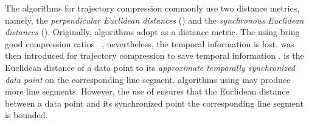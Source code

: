 %
The \lsa algorithms for trajectory compression commonly use two distance metrics, namely, the \emph{perpendicular Euclidean distances} (\ped) and the \emph{synchronous Euclidean distances} (\sed).
Originally, \lsa algorithms adopt \ped as a distance metric.
The using \ped bring good compression ratios~ \cite{Douglas:Peucker, Hershberger:Speeding, Liu:BQS, Muckell:Compression, Chen:Trajectory, Cao:Spatio, Shi:Survey}, nevertheless, the temporal information is lost. 
%
\sed was then introduced for trajectory compression to save temporal information \cite{Meratnia:Spatiotemporal}. \sed is the Euclidean distance of a data point to its \emph{approximate temporally synchronized data point} \cite{Meratnia:Spatiotemporal} on the corresponding line segment. 
\lsa algorithms using \sed may produce more line segments. However, the use of \sed ensures that the Euclidean distance between a data point and its synchronized point \wrt the corresponding line segment is bounded. 

